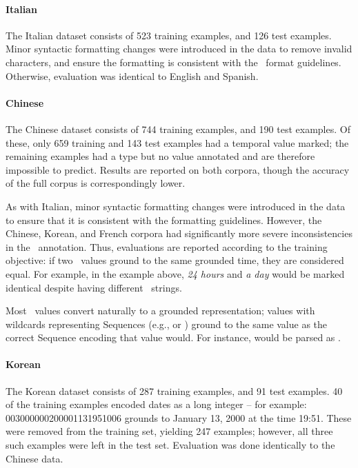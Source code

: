 \paragraph{Italian}
The Italian dataset consists of 523 training examples, and 126 test examples.
Minor syntactic formatting changes were introduced in the data to remove invalid
  characters, and ensure the formatting is consistent with the
  \tempeval\ format guidelines.
Otherwise, evaluation was identical to English and Spanish.

\paragraph{Chinese}
The Chinese dataset consists of 744 training examples, and 190 test examples.
Of these, only 659 training and 143 test examples had a temporal value marked;
  the remaining examples had a type but no value annotated and are therefore
  impossible to predict.
Results are reported on both corpora, though the accuracy of the full corpus
  is correspondingly lower.

As with Italian, minor syntactic formatting changes were introduced in the data
  to ensure that it is consistent with the formatting guidelines.
However, the Chinese, Korean, and French corpora had significantly more severe
  inconsistencies in the \timex\ annotation.
Thus, evaluations are reported according to the training objective: if two
  \timex\ values ground to the same grounded time, they are considered equal.
For example, in the example above, \textit{24 hours} and \textit{a day}
  would be marked identical despite having different \timex\ strings.

Most \timex\ values convert naturally to a grounded representation; values
  with wildcards representing Sequences (e.g.,  or )
  ground to the same value as the correct Sequence encoding that value would.
For instance,  would be parsed as .

\paragraph{Korean}
The Korean dataset consists of 287 training examples, and 91 test examples.
40 of the training examples encoded dates as a long integer -- for
  example: 003000000200001131951006 grounds to January 13, 2000 at the time
  19:51.
These were removed from the training set, yielding 247 examples; however,
  all three such examples were left in the test set.
Evaluation was done identically to the Chinese data.

